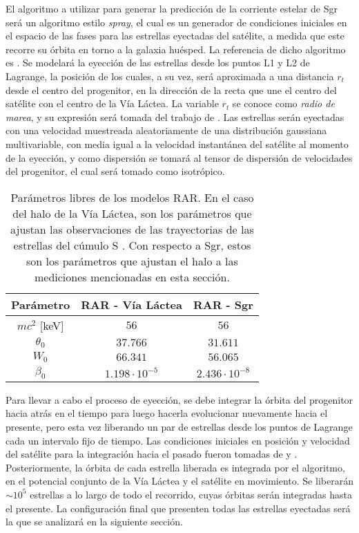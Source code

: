 \documentclass[baaa]{baaa}
\begin{document}
El algoritmo a utilizar para generar la predicción de la corriente estelar de Sgr será un algoritmo estilo \textit{spray},  el cual es un generador de condiciones iniciales en el espacio de las fases para las estrellas eyectadas del satélite, a medida que este recorre su órbita en torno a la galaxia huésped. La referencia de dicho algoritmo es \cite{Gibbons2014}. Se modelará la eyección de las estrellas desde los puntos L1 y L2 de Lagrange, la posición de los cuales, a su vez, será aproximada a una distancia $r_{t}$ desde el centro del progenitor, en la dirección de la recta que une el centro del satélite con el centro de la Vía Láctea. La variable $r_{t}$ se conoce como \textit{radio de marea}, y su expresión será tomada del trabajo de \cite{Gajda2016}. Las estrellas serán eyectadas con una velocidad muestreada aleatoriamente de una distribución gaussiana multivariable, con media igual a la velocidad instantánea del satélite al momento de la eyección, y como dispersión se tomará al tensor de dispersión de velocidades del progenitor, el cual será tomado como isotrópico.

\begin{table}
    \caption{Parámetros libres de los modelos RAR. En el caso del halo de la Vía Láctea, son los parámetros que ajustan las observaciones de las trayectorias de las estrellas del cúmulo S \citep{BecerraVergara2020, BecerraVergara2021}. Con respecto a Sgr, estos son los parámetros que ajustan el halo a las mediciones mencionadas en esta sección.}
    \label{tab:rar_best_fit_parameters}
    \centering
    \begin{tabular}{c|c|c}
        \hline
        \textbf{Parámetro} & \textbf{RAR - Vía Láctea} & \textbf{RAR - Sgr} \\
        \hline
        $mc^{2}$ [keV] & $56$ & $56$ \\
        $\theta_{0}$ & $37.766$ & $31.611$ \\
        $W_{0}$ & $66.341$ & $56.065$ \\
        $\beta_{0}$ & $1.198\cdot 10^{-5}$ & $2.436\cdot 10^{-8}$ \\
        \hline
    \end{tabular}
\end{table}

Para llevar a cabo el proceso de eyección, se debe integrar la órbita del progenitor hacia atrás en el tiempo para luego hacerla evolucionar nuevamente hacia el presente, pero esta vez liberando un par de estrellas desde los puntos de Lagrange cada un intervalo fijo de tiempo. Las condiciones iniciales en posición y velocidad del satélite para la integración hacia el pasado fueron tomadas de \cite{Gibbons2014} y \cite{Vasiliev2020}. Posteriormente, la órbita de cada estrella liberada es integrada por el algoritmo, en el potencial conjunto de la Vía Láctea y el satélite en movimiento. Se liberarán $\sim 10^{5}$ estrellas a lo largo de todo el recorrido, cuyas órbitas serán integradas hasta el presente. La configuración final que presenten todas las estrellas eyectadas será la que se analizará en la siguiente sección.
\end{document}
